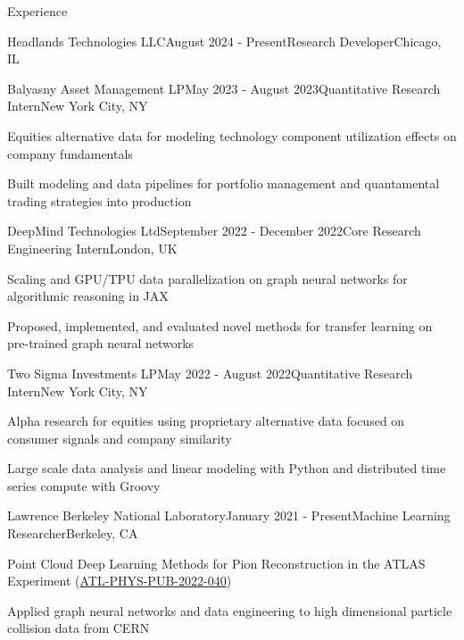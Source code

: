 \documentclass{resume} %
\begin{document}
\begin{rSection}{Experience}

\begin{rSubsection}{Headlands Technologies LLC}{August 2024 - Present}{Research Developer}{Chicago, IL}
    \item
\end{rSubsection}
\vspace{-1.35em}  %

\begin{rSubsection}{Balyasny Asset Management LP}{May 2023 - August 2023}{Quantitative Research Intern}{New York City, NY}
    \item Equities alternative data for modeling technology component utilization effects on company fundamentals
    \item Built modeling and data pipelines for portfolio management and quantamental trading strategies into production
\end{rSubsection}

\begin{rSubsection}{DeepMind Technologies Ltd}{September 2022 - December 2022}{Core Research Engineering Intern}{London, UK}
    \item Scaling and GPU/TPU data parallelization on graph neural networks for algorithmic reasoning in JAX
    \item Proposed, implemented, and evaluated novel methods for transfer learning on pre-trained graph neural networks
\end{rSubsection}

\begin{rSubsection}{Two Sigma Investments LP}{May 2022 - August 2022}{Quantitative Research Intern}{New York City, NY}
     \item Alpha research for equities using proprietary alternative data focused on consumer signals and company similarity
     \item Large scale data analysis and linear modeling with Python and distributed time series compute with Groovy
\end{rSubsection}

\begin{rSubsection}{Lawrence Berkeley National Laboratory}{January 2021 - Present}{Machine Learning Researcher}{Berkeley, CA}
    \item Point Cloud Deep Learning Methods for Pion Reconstruction in the ATLAS Experiment (\href{https://cds.cern.ch/record/2825379/files/ATL-PHYS-PUB-2022-040.pdf}{ATL-PHYS-PUB-2022-040})    
    \item Applied graph neural networks and data engineering to high dimensional particle collision data from CERN
\end{rSubsection}


\end{rSection}
\end{document}
